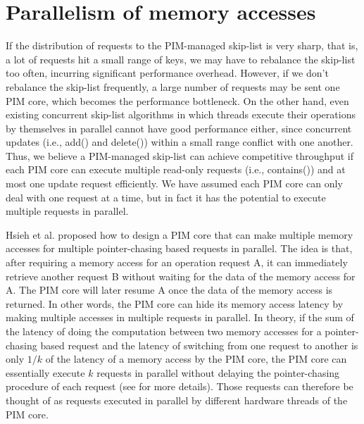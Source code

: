 \documentclass[11pt]{article}
\begin{document}
\newpage





\appendix

\section{Parallelism of memory accesses}
If the distribution of requests to the PIM-managed skip-list is very sharp, that is, 
a lot of requests hit a small range of keys, we may have to rebalance the skip-list too often, 
incurring significant performance overhead. 
However, if we don't rebalance the skip-list frequently, 
a large number of requests may be sent one PIM core, which becomes the performance bottleneck. 
On the other hand, even existing concurrent skip-list algorithms in which threads execute 
their operations by themselves in parallel cannot have good performance either, 
since concurrent updates (i.e., add() and delete()) within a small range conflict with one another. 
Thus, we believe a PIM-managed skip-list can achieve competitive throughput if each PIM core can 
execute multiple read-only requests (i.e., contains()) and at most one update request efficiently. 
We have assumed each PIM core can only deal with one request at a time, 
but in fact it has the potential to execute multiple requests in parallel.

Hsieh et al. \cite{hsieh2016accelerating} proposed how to design a PIM core that 
can make multiple memory accesses for multiple pointer-chasing based requests in parallel. 
The idea is that, after requiring a memory access for an operation request A, 
it can immediately retrieve another request B without waiting for the data of the memory access for A. 
The PIM core will later resume A once the data of the memory access is returned.  
In other words, the PIM core can hide its memory access latency by making multiple accesses 
in multiple requests in parallel. 
In theory, if the sum of the latency of doing the computation between two memory accesses 
for a pointer-chasing based request and the latency of switching from one request to another 
is only $1/k$ of the latency of a memory access by the PIM core, 
the PIM core can essentially execute $k$ requests in parallel without delaying the pointer-chasing 
procedure of each request (see \cite{hsieh2016accelerating} for more details). 
Those requests can therefore be thought of as requests executed in parallel
by different hardware threads of the PIM core. 
\end{document}
